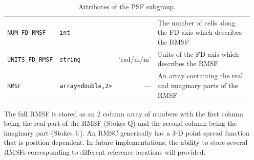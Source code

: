 \documentclass[a4paper,10pt,bibtotoc]{scrartcl}
\begin{document}
\begin{table}[htbp]
\begin{tabular}{|llrp{6.5cm}|}
    \small{\verb|NUM_FD_RMSF|} & \small\verb|int| & --- & The number of cells along the FD axis which describes the RMSF \\
    \small{\verb|UNITS_FD_RMSF|} & \small\verb|string| & `rad/m/m' & Units of the FD axis which describes the RMSF \\
    \small{\verb|RMSF|}	& \small\verb|array<double,2>| & --- & An array containing the real and imaginary parts of the RMSF \\
    \hline        
  \end{tabular}
  \caption{Attributes of the PSF subgroup.}
  \label{tab:psf_subgroup}
\end{table}

The full RMSF is stored as an 2 column array of numbers with the first column being the real part of the RMSF (Stokes Q) and the second column being the imaginary part (Stokes U).  An RMSC generically has a 3-D point spread function that is position dependent.  In future implementations, the ability to store several RMSFs corresponding to different reference locations will provided.

\end{document}

